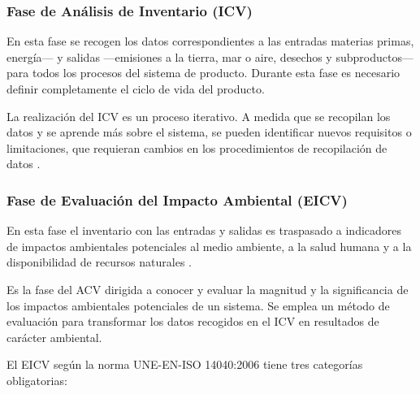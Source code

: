 \subsubsection{Fase de Análisis de Inventario (ICV)}
En esta fase se recogen los datos correspondientes a las entradas materias primas, energía— y salidas —emisiones a la tierra, mar o aire, desechos y subproductos— para todos los procesos del sistema de producto. Durante esta fase es necesario definir completamente el ciclo de vida del producto.

La realización del ICV es un proceso iterativo. A medida que se recopilan los datos y se aprende más sobre el sistema, se pueden identificar nuevos requisitos o limitaciones, que requieran cambios en los procedimientos de recopilación de datos \cite{iso14040,ihobeeco}.

\subsubsection{Fase de Evaluación del Impacto Ambiental (EICV)}
En esta fase el inventario con las entradas y salidas es traspasado a indicadores de impactos ambientales potenciales al medio ambiente, a la salud humana y a la disponibilidad de recursos naturales \cite{iso14040,ihobeeco}.

Es la fase del ACV dirigida a conocer y evaluar la magnitud y la significancia de los impactos ambientales potenciales de un sistema. Se emplea un método de evaluación para transformar los datos recogidos en el ICV en resultados de carácter ambiental.

El EICV según la norma UNE-EN-ISO 14040:2006 \cite{iso14040} tiene tres categorías obligatorias:

